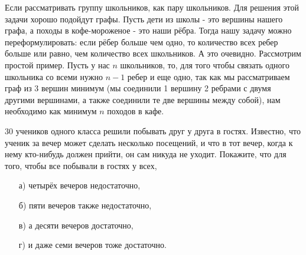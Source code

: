 \documentclass{article}
\begin{document}
\begin{solution}[6]
Если рассматривать группу школьников, как пару школьников.
Для решения этой задачи хорошо подойдут графы. Пусть дети из школы - это вершины нашего графа, а походы в кофе-мороженое - это наши рёбра. Тогда нашу задачу можно переформулировать: если рёбер больше чем одно, то количество всех ребер больше или равно, чем количество всех школьников. А это очевидно. Рассмотрим простой пример. Пусть у нас $n$ школьников, то, для того чтобы связать одного школьника со всеми нужно $n - 1$ ребер и еще одно, так как мы рассматриваем граф из 3 вершин минимум (мы соединили 1 вершину 2 ребрами с двумя другими вершинами, а также соединили те две вершины между собой), нам необходимо как минимум $n$ походов в кафе.

\end{solution}

\begin{task}[3]
30 учеников одного класса решили побывать друг у друга в гостях. Известно, что ученик за вечер может сделать несколько посещений, и что в тот вечер, когда к нему кто-нибудь должен прийти, он сам никуда не уходит. Покажите, что для того, чтобы все побывали в гостях у всех,
\begin{enumerate}
    \item[а)] четырёх вечеров недостаточно,
    \item[б)] пяти вечеров также недостаточно,
    \item[в)] а десяти вечеров достаточно,
    \item[г)] и даже семи вечеров тоже достаточно.
\end{enumerate}
\end{task}
\end{document}
